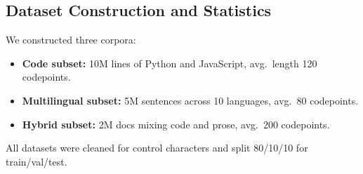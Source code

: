 \subsection{Dataset Construction and Statistics}
\label{sec:dataset}

We constructed three corpora:
\begin{itemize}[leftmargin=1.5em]
	\item \textbf{Code subset:} 10M lines of Python and JavaScript, avg.\ length 120 codepoints.
	\item \textbf{Multilingual subset:} 5M sentences across 10 languages, avg.\ 80 codepoints.
	\item \textbf{Hybrid subset:} 2M docs mixing code and prose, avg.\ 200 codepoints.
\end{itemize}
All datasets were cleaned for control characters and split 80/10/10 for train/val/test.
